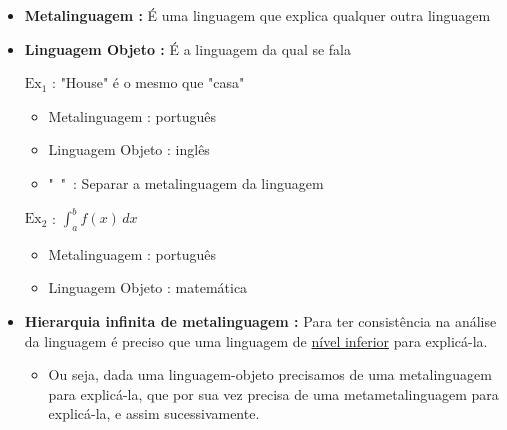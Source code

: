             \begin{itemize}[left=0.5cm, align=left, nosep]
                \item \textbf{Metalinguagem :} É uma linguagem que explica qualquer outra linguagem   
                \item \textbf{Linguagem Objeto :} É a linguagem da qual se fala
                 
                $\text{Ex}_1$ : "House" é o mesmo que "casa"   
                \begin{itemize}[left=0.5cm, nosep, label=$\hookrightarrow$]
                    \item Metalinguagem : português
                    \item Linguagem Objeto : inglês
                    \item "\ "\ : Separar a metalinguagem da linguagem
                \end{itemize}
        
                \vspace{0.5cm}
                $\text{Ex}_2$ : $\int_{a}^{b} f(x) \,dx$   
                \begin{itemize}[left=0.5cm, nosep, label=$\hookrightarrow$]
                    \item Metalinguagem : português
                    \item Linguagem Objeto : matemática
                \end{itemize}
                
                \item \textbf{Hierarquia infinita de metalinguagem :} Para ter consistência na análise da linguagem é 
                preciso que uma linguagem de \underline{nível inferior} para explicá-la.
                
                \begin{itemize}[left=0.5cm, nosep, label=$\hookrightarrow$]
                    \item Ou seja, dada uma linguagem-objeto precisamos de uma metalinguagem para 
                    explicá-la, que por sua vez precisa de uma metametalinguagem para explicá-la, 
                    e assim sucessivamente. 
                \end{itemize}

                \vspace{0.5cm}


\end{itemize}
